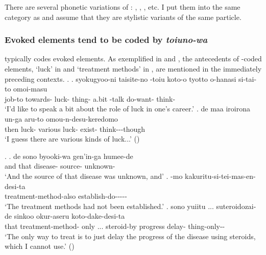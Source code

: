 There are several phonetic variations of :
, , , etc.
I put them into the same category as  and assume that they are stylistic variants of the same particle.


\subsubsection{Evoked elements tend to be coded by \textit{toiuno-wa}}

 typically codes evoked elements.
As exemplified in \Next and \NNext,
the antecedents of -coded elements,
 `luck' in \Next and  `treatment methods' in \NNext,
are mentioned in the immediately preceding contexts.
%
\ex.
 \ag. syokugyoo-ni taisite-no -toiu koto-o tyotto o-hanasi si-tai-to omoi-masu \\
		job-to towards- luck- thing- a.bit -talk do-want- think- \\
		`I'd like to speak a bit about the role of luck in one's career.'
 \bg. de  maa iroirona un-ga aru-to omou-n-desu-keredomo \\
 	then luck-  various luck- exist- think---though \\
	`I guess there are various kinds of luck...'
	\hfill{()}

\ex. \ag. de sono byooki-wa gen'in-ga humee-de \\
	and that disease- source- unknown- \\
	`And the source of that disease was unknown, and'
	\bg. -mo kakuritu-si-tei-mas-en-desi-ta \\
		treatment-method-also establish-do----- \\
		`The treatment methods had not been established.'
	\bg. sono  yuiitu ... suteroidozai-de sinkoo okur-aseru koto-dake-desi-ta \\
		that treatment-method- only ... steroid-by progress delay- thing-only-- \\
		`The only way to treat is to just delay the progress of the disease using steroids, which I cannot use.' \hfill{()}

